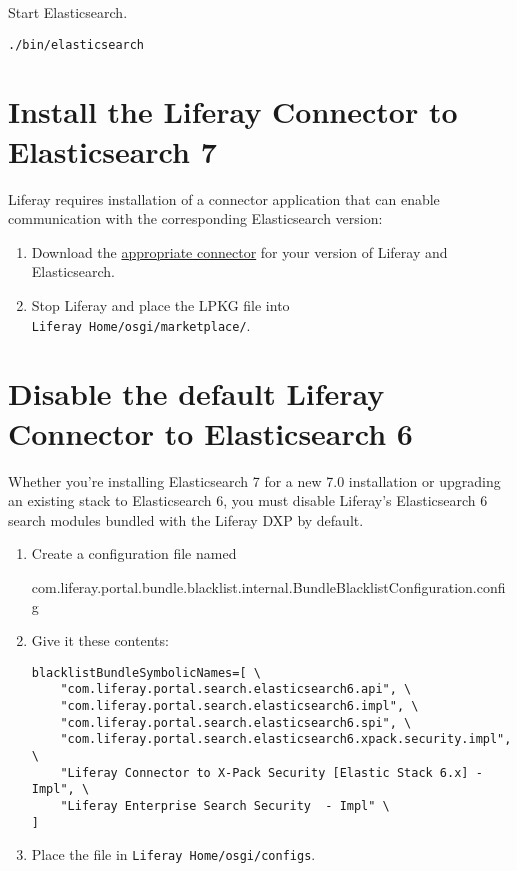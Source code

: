 Start Elasticsearch.

\begin{verbatim}
./bin/elasticsearch
\end{verbatim}

\section{Install the Liferay Connector to Elasticsearch
7}\label{install-the-liferay-connector-to-elasticsearch-7}

Liferay requires installation of a connector application that can enable
communication with the corresponding Elasticsearch version:

\begin{enumerate}
\def\labelenumi{\arabic{enumi}.}
\item
  Download the
  \href{https://help.liferay.com/hc/en-us/articles/360016511651\#Liferay-DXP-7.1}{appropriate
  connector} for your version of Liferay and Elasticsearch.
\item
  Stop Liferay and place the LPKG file into
  \texttt{Liferay\ Home/osgi/marketplace/}.
\end{enumerate}

\section{Disable the default Liferay Connector to Elasticsearch
6}\label{disable-the-default-liferay-connector-to-elasticsearch-6}

Whether you're installing Elasticsearch 7 for a new 7.0 installation or
upgrading an existing stack to Elasticsearch 6, you must disable
Liferay's Elasticsearch 6 search modules bundled with the Liferay DXP by
default.

\begin{enumerate}
\def\labelenumi{\arabic{enumi}.}
\item
  Create a configuration file named

  com.liferay.portal.bundle.blacklist.internal.BundleBlacklistConfiguration.config
\item
  Give it these contents:

\begin{verbatim}
blacklistBundleSymbolicNames=[ \
    "com.liferay.portal.search.elasticsearch6.api", \
    "com.liferay.portal.search.elasticsearch6.impl", \
    "com.liferay.portal.search.elasticsearch6.spi", \
    "com.liferay.portal.search.elasticsearch6.xpack.security.impl", \
    "Liferay Connector to X-Pack Security [Elastic Stack 6.x] - Impl", \
    "Liferay Enterprise Search Security  - Impl" \
]
\end{verbatim}
\item
  Place the file in \texttt{Liferay\ Home/osgi/configs}.
\end{enumerate}

